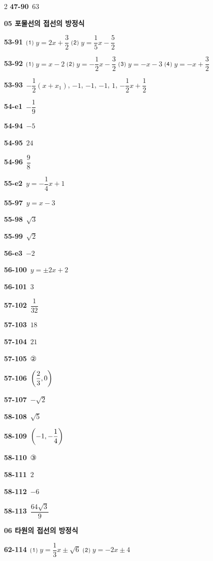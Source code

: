\documentclass[10pt,a4paper]{article}
\begin{document}
\begin{multicols}{2}
\noindent\textbf{47-90}\ $63$\par
\noindent\textbf{05 포물선의 접선의 방정식}\par\smallskip
\noindent\textbf{53-91}\ ⑴ $y=2x+\dfrac{3}{2}$ ⑵ $y=\dfrac{1}{5}x-\dfrac{5}{2}$\par
\noindent\textbf{53-92}\ ⑴ $y=x-2$ ⑵ $y=-\dfrac{1}{2}x-\dfrac{3}{2}$ ⑶ $y=-x-3$ ⑷ $y=-x+\dfrac{3}{2}$\par
\noindent\textbf{53-93}\ $-\dfrac{1}{2}(x+x_1)$, $-1$, $-1$, $-1$, $1$, $-\dfrac{1}{2}x+\dfrac{1}{2}$\par
\noindent\textbf{54-e1}\ $-\dfrac{1}{9}$\par
\noindent\textbf{54-94}\ $-5$\par
\noindent\textbf{54-95}\ $24$\par
\noindent\textbf{54-96}\ $\dfrac{9}{8}$\par
\noindent\textbf{55-e2}\ $y=-\dfrac{1}{4}x+1$\par
\noindent\textbf{55-97}\ $y=x-3$\par
\noindent\textbf{55-98}\ $\sqrt{3}$\par
\noindent\textbf{55-99}\ $\sqrt{2}$\par
\noindent\textbf{56-e3}\ $-2$\par
\noindent\textbf{56-100}\ $y=\pm 2x+2$\par
\noindent\textbf{56-101}\ $3$\par
\noindent\textbf{57-102}\ $\dfrac{1}{32}$\par
\noindent\textbf{57-103}\ $18$\par
\noindent\textbf{57-104}\ $21$\par
\noindent\textbf{57-105}\ ②\par
\noindent\textbf{57-106}\ $\left(\dfrac{2}{3}{,}\mkern3mu\mathopen{}0\right)$\par
\noindent\textbf{57-107}\ $-\sqrt{2}$\par
\noindent\textbf{58-108}\ $\sqrt{5}$\par
\noindent\textbf{58-109}\ $\left(-1{,}\mkern3mu\mathopen{}-\dfrac{1}{4}\right)$\par
\noindent\textbf{58-110}\ ③\par
\noindent\textbf{58-111}\ $2$\par
\noindent\textbf{58-112}\ $-6$\par
\noindent\textbf{58-113}\ $\dfrac{64\sqrt{3}}{9}$\par
\noindent\textbf{06 타원의 접선의 방정식}\par\smallskip
\noindent\textbf{62-114}\ ⑴ $y=\dfrac{1}{3}x\pm\sqrt{6}$ ⑵ $y=-2x\pm4$\par

\end{multicols}
\end{document}
